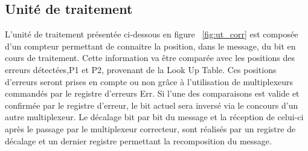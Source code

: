 \documentclass[a4paper, 11pt, svgnames]{report}
\begin{document}
            \subsection{Unité de traitement}
                L'unité de traitement présentée ci-dessous en 
                figure ~\ref{fig:ut_corr} est composée d'un compteur 
                permettant de connaitre la position, dans le message, du bit en
                cours de traitement. Cette information va être comparée avec
                les positions des erreurs détectées,P1 et P2, provenant de la
                Look Up Table. Ces positions d'erreurs seront prises en compte
                ou non grâce à l'utilisation de multiplexeurs commandés par le
                registre d'erreurs Err. Si l'une des comparaisons est valide et
                confirmée par le registre d'erreur, le bit actuel sera inversé
                via le concours d'un autre multiplexeur. Le décalage bit par 
                bit du message et la réception de celui-ci après le passage par
                le multiplexeur correcteur, sont réalisés par un registre de 
                décalage et un dernier registre permettant la recomposition 
                du message. 
\end{document}
